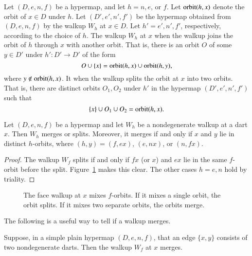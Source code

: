 \begin{definition} 
Let $(D,e,n,f)$ be a hypermap, and let $h=n,e$, or $f$.  Let ${\operatorname{orbit}}(h,x)$
denote the orbit of $x\in D$ under $h$.  Let $(D',e',n',f')$ be the hypermap obtained
from $(D,e,n,f)$ by the walkup $W_h$ at $x\in D$.
Let $h'=e',n',f'$, respectively, according to the choice of $h$.
The walkup $W_h$ at $x$  when the walkup joins the
orbit of $h$ through $x$ with another orbit.  That is, there is an orbit $O$ of some
$y\in D'$ under $h':D'\to D'$ of the form
\begin{displaymath}
O \cup\{x\} = {\operatorname{orbit}}(h,x) \cup {\operatorname{orbit}}(h,y),
\end{displaymath}
where $y\not\in {\operatorname{orbit}}(h,x)$.
It 
when the walkup splits the orbit at $x$ into two orbits.  That is, there are 
distinct orbits $O_1,O_2$ under $h'$ in the hypermap $(D',e',n',f')$ such that
\begin{displaymath}
\{x\}\cup O_1\cup O_2 = {\operatorname{orbit}}(h,x).
\end{displaymath}
%
%
%
\end{definition}

\begin{lemma} 
  Let $(D,e,n,f)$ be a hypermap and let $W_h$ be a nondegenerate
  walkup at a dart $x$.  Then $W_h$ merges or splits. Moreover, it merges if
  and only if $x$ and $y$ lie in distinct $h$-orbits, where
  $(h,y)=(f,e x)$,  $(e,n x)$, or $(n,f x)$.
\end{lemma}

\begin{proof} The walkup $W_f$ splits if and only if $f x$ 
(or $x$)
and $e x$ lie in the same $f$-orbit before the split. 
Figure~\ref{fig:split} makes this clear.
The other cases $h=e,n$ hold by triality.
\end{proof}


\begin{figure}[htb]
\centering
{}
\caption{The face walkup at $x$ mixes $f$-orbits.  If it mixes a
single orbit, the orbit splits. If it mixes two separate orbits, the
orbits merge. }
\label{fig:split}
\end{figure}

The following is a useful way to tell if a walkup merges.


\begin{lemma}  
Suppose, in a simple plain hypermap $(D,e,n,f)$, that an edge $\{x,y\}$ consists
of two nondegenerate darts.  Then the walkup $W_f$ 
at $x$ merges.
\end{lemma}
%

